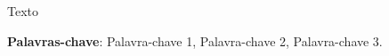 \begin{resumo}

Texto

\textbf{Palavras-chave}: Palavra-chave 1, Palavra-chave 2, Palavra-chave 3.
\end{resumo}

